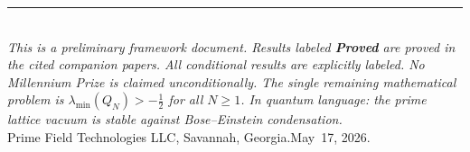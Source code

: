 \documentclass[12pt]{article}
\newcommand{\half}{\tfrac{1}{2}}
\begin{document}
\vspace{1.4em}
\noindent\rule{\textwidth}{0.4pt}\\[5pt]
\noindent\small\textit{%
This is a preliminary framework document.
Results labeled \textbf{Proved} are proved in the cited companion papers.
All conditional results are explicitly labeled.
No Millennium Prize is claimed unconditionally.
The single remaining mathematical problem is
$\lambda_{\min}(Q_N) > -\half$ for all $N\ge1$.
In quantum language: the prime lattice vacuum is stable
against Bose--Einstein condensation.}\\[4pt]
\noindent\small Prime Field Technologies LLC,
Savannah, Georgia.\quad May~17, 2026.
\end{document}
